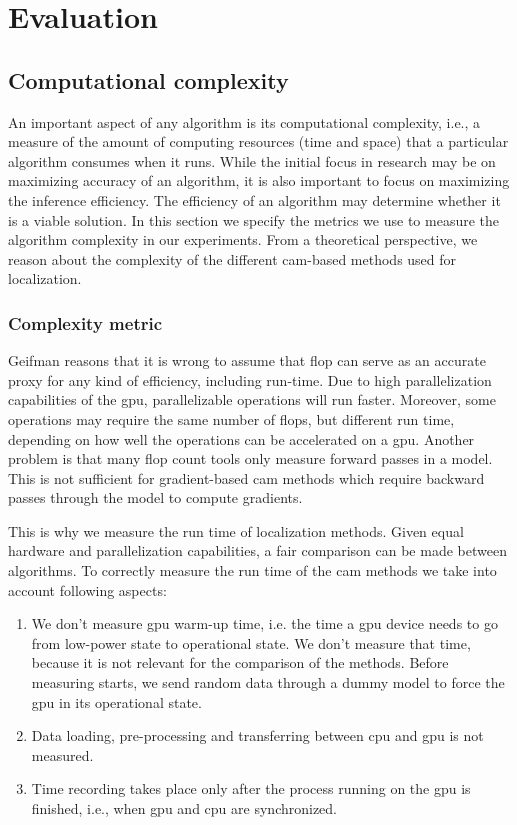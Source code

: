 \section{Evaluation}
\subsection{Computational complexity} \label{sec:computational_complexity}
An important aspect of any algorithm is its computational complexity, i.e., a measure of the amount of computing resources (time and space) that a particular algorithm consumes when it runs. While the initial focus in research may be on maximizing accuracy of an algorithm, it is also important to focus on maximizing the inference efficiency. The efficiency of an algorithm may determine whether it is a viable solution. In this section we specify the metrics we use to measure the algorithm complexity in our experiments. From a theoretical perspective, we reason about the complexity of the different \acrshort{cam}-based methods used for localization.

\subsubsection{Complexity metric}
Geifman \cite{article:FLOPSvsRuntime} reasons that it is wrong to assume that \acrfull{flop} can serve as an accurate proxy for any kind of efficiency, including run-time. Due to high parallelization capabilities of the \acrshort{gpu}, parallelizable operations will run faster. Moreover, some operations may require the same number of \acrshort{flop}s, but different run time, depending on how well the operations can be accelerated on a \acrshort{gpu}. Another problem is that many \acrshort{flop} count tools only measure forward passes in a model. This is not sufficient for gradient-based \acrshort{cam} methods which require backward passes through the model to compute gradients.

This is why we measure the run time of localization methods. Given equal hardware and parallelization capabilities, a fair comparison can be made between algorithms. To correctly measure the run time of the \acrshort{cam} methods we take into account following aspects:
\begin{enumerate}
    \item We don't measure \acrshort{gpu} warm-up time, i.e. the time a \acrshort{gpu} device needs to go from low-power state to operational state. We don't measure that time, because it is not relevant for the comparison of the methods. Before measuring starts, we send random data through a dummy model to force the \acrshort{gpu} in its operational state.
    \item Data loading, pre-processing and transferring between \acrshort{cpu} and \acrshort{gpu} is not measured.
    \item  Time recording takes place only after the process running on the \acrshort{gpu} is finished, i.e., when \acrshort{gpu} and \acrshort{cpu} are synchronized.
\end{enumerate}
